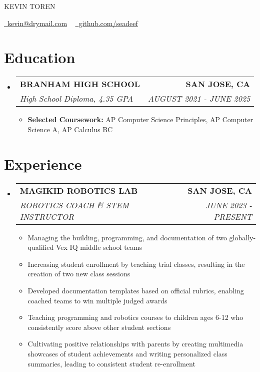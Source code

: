 \documentclass[letterpaper,11pt]{article}
\makeatletter
\newcommand{\resumeItem}[1]{
  \item\small{
    {#1 \vspace{-3pt}}
  }
}
\newcommand{\resumeSubheading}[4]{
  \vspace{-3pt}\item
    \begin{tabular*}{1.0\textwidth}[t]{l@{\extracolsep{\fill}}r}
      \textbf{#1} & \textbf{\small #2} \\
      \textit{\small#3} & \textit{\small #4} \\
    \end{tabular*}\vspace{-7pt}
}
\newcommand{\resumeSubHeadingListStart}{\begin{itemize}[leftmargin=0.0in, label={}]}
\newcommand{\resumeSubHeadingListEnd}{\end{itemize}}
\newcommand{\resumeItemListStart}{\begin{itemize}}
\newcommand{\resumeItemListEnd}{\end{itemize}\vspace{0pt}}
\makeatother
\begin{document}
    \begin{center}
        {\Huge\scshape KEVIN TOREN} 
        
        \vspace{5 pt}
        \small
        \href{mailto:kevin@drymail.com}{\raisebox{-0.2\height}\faEnvelope\  \underline{kevin@drymail.com}} ~ 
        \href{https://github.com/seadeef}{\raisebox{-0.2\height}\faGithub\ \underline{github.com/seadeef}}
    \end{center}

\section{Education}
  \resumeSubHeadingListStart
  
    \resumeSubheading
    {BRANHAM HIGH SCHOOL}{SAN JOSE, CA}
    {High School Diploma, 4.35 GPA}{AUGUST 2021 - JUNE 2025}
        \resumeItemListStart
            \resumeItem{\textbf{Selected Coursework:}  AP Computer Science Principles, AP Computer Science A, AP Calculus BC}
            
        \resumeItemListEnd
        
  \resumeSubHeadingListEnd


\section{Experience}
    \resumeSubHeadingListStart
    
        \resumeSubheading
        {MAGIKID ROBOTICS LAB}{SAN JOSE, CA}
            {ROBOTICS COACH \& STEM INSTRUCTOR}{JUNE 2023 - PRESENT}
            \resumeItemListStart
                \resumeItem{Managing the building, programming, and documentation of two globally-qualified Vex IQ middle school teams}
                \resumeItem{Increasing student enrollment by teaching trial classes, resulting in the creation of two new class sessions}
                \resumeItem{Developed documentation templates based on official rubrics, enabling coached teams to win multiple judged awards}
                \resumeItem{Teaching programming and robotics courses to children ages 6-12 who consistently score above other student sections}
                \resumeItem{Cultivating positive relationships with parents by creating multimedia showcases of student achievements and writing personalized class summaries, leading to consistent student re-enrollment}
            \resumeItemListEnd
    \resumeSubHeadingListEnd
\end{document}
